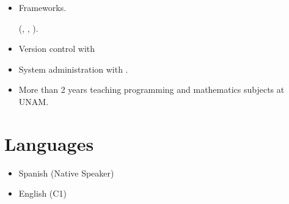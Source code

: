 \documentclass{resume}
\begin{document}
\begin{paracol}{2}
\begin{itemize}
        \item Frameworks.
          
          (, , ).
          
        \item Version control with 
          
        \item System administration with .

        \item More than 2 years teaching programming and mathematics subjects at
          UNAM.

      \end{itemize}
      
    \section{Languages}
    
      \begin{itemize}
        \item Spanish (Native Speaker)
        \item English (C1)
      \end{itemize}
    
  \end{paracol}
\end{document}
